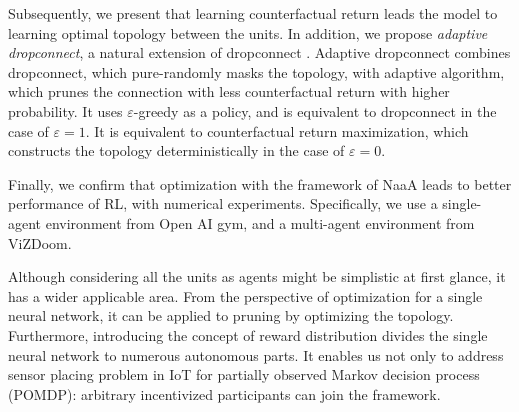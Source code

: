 Subsequently, we present that learning counterfactual return leads the model to learning optimal topology between the units.
In addition, we propose {\em adaptive dropconnect}, a natural extension of dropconnect \citep{wan2013regularization}.
Adaptive dropconnect combines dropconnect, which pure-randomly masks the topology, with adaptive algorithm, which prunes the connection with less counterfactual return with higher probability.
It uses $\varepsilon$-greedy as a policy, and is equivalent to dropconnect in the case of $\varepsilon = 1$. It is equivalent to counterfactual return maximization, which constructs the topology deterministically in the case of $\varepsilon = 0$.

Finally, we confirm that optimization with the framework of NaaA leads to better performance of RL, with numerical experiments.
Specifically, we use a single-agent environment from Open AI gym, and a multi-agent environment from ViZDoom.

Although considering all the units as agents might be simplistic at first glance, it has a wider applicable area.
From the perspective of optimization for a single neural network, it can be applied to pruning by optimizing the topology.
Furthermore, introducing the concept of reward distribution divides the single neural network to numerous autonomous parts.
It enables us not only to address sensor placing problem in IoT for partially observed Markov decision process (POMDP): arbitrary incentivized participants can join the framework.
 
